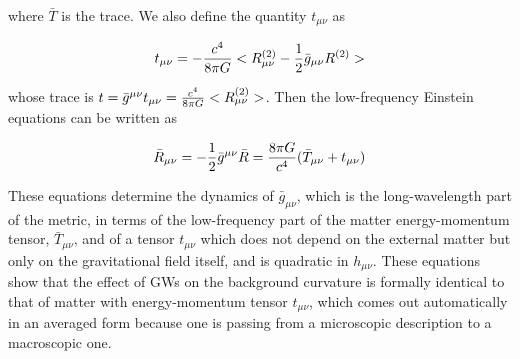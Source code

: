\documentclass[binding=0.6cm, LaM]{sapthesis}
\begin{document}
	where ${\bar T}$ is the trace.
	We also define the quantity $t_{\mu\nu}$ as

		\begin{equation}
		t_{\mu\nu} = -{{c^4}\over{8\pi G}}<R_{\mu\nu}^{(2)} - {1 \over 2}{\bar g_{\mu \nu}}R^{(2)}>
		\end{equation}

	whose trace is $t= {\bar g^{\mu\nu}}t_{\mu\nu} = {{c^4}\over{8\pi G}}<R_{\mu\nu}^{(2)}>$.
	Then the low-frequency Einstein equations can be written as

		\begin{equation}
		 {\bar R_{\mu\nu}} = -{1 \over 2}{\bar g^{\mu\nu}} {\bar R} =  {{8\pi G}\over c^4}({\bar T_{\mu\nu}}+t_{\mu\nu})
		\end{equation}

	These equations determine the dynamics of $\bar g_{\mu\nu}$, which is the long-wavelength part of the metric, 
	in terms of the low-frequency part of the matter energy-momentum tensor, $\bar T_{\mu\nu}$, 
	and of a tensor $t_{\mu\nu}$ which does not depend on the external matter but only on the gravitational field itself, 
	and is quadratic in $h_{\mu\nu}$.
	These equations show that the effect of GWs on the background curvature is formally identical to that of matter 
	with energy-momentum tensor $t_{\mu\nu}$, which comes out automatically in an averaged form because 
	one is passing from a microscopic description to a macroscopic one.

















































\end{document}

